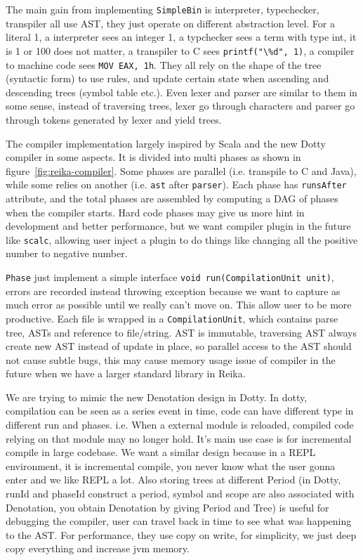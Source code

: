 \documentclass{article}
\begin{document}
The main gain from implementing \verb+SimpleBin+ is interpreter, typechecker, transpiler all use AST,
they just operate on different abstraction level.
For a literal 1, a interpreter sees an integer 1,
a typchecker sees a term with type int, it is 1 or 100 does not matter,
a transpiler to C sees \verb+printf("\%d", 1)+,
a compiler to machine code sees \verb+MOV EAX, 1h+.
They all rely on the shape of the tree (syntactic form) to use rules,
and update certain state when ascending and descending trees (symbol table etc.).
Even lexer and parser are similar to them in some sense, instead of traversing trees,
lexer go through characters and parser go through tokens generated by lexer and yield trees.

The compiler implementation largely inspired by Scala and the new Dotty compiler in some aspects.
It is divided into multi phases as shown in figure~\ref{fig:reika-compiler}.
Some phases are parallel (i.e. transpile to C and Java), while some relies on another (i.e. \verb+ast+ after \verb+parser+).
Each phase has \verb+runsAfter+ attribute,
and the total phases are assembled by computing a DAG of phases when the compiler starts.
Hard code phases may give us more hint in development and better performance,
but we want compiler plugin in the future like \verb+scalc+,
allowing user inject a plugin to do things like changing all the positive number to negative number.

\verb+Phase+ just implement a simple interface \verb+void run(CompilationUnit unit)+,
errors are recorded instead throwing exception because we want to capture as much error as possible until we really can't move on.
This allow user to be more productive.
Each file is wrapped in a \verb+CompilationUnit+, which contains parse tree, ASTs and reference to file/string.
AST is immutable, traversing AST always create new AST instead of update in place,
so parallel access to the AST should not cause subtle bugs,
this may cause memory usage issue of compiler in the future when we have a larger standard library in Reika.

We are trying to mimic the new Denotation design in Dotty.
In dotty, compilation can be seen as a series event in time,
code can have different type in different run and phases.
i.e. When a external module is reloaded, compiled code relying on that module may no longer hold.
It's main use case is for incremental compile in large codebase.
We want a similar design because in a REPL environment,
it is incremental compile, you never know what the user gonna enter and we like REPL a lot.
Also storing trees at different Period
(in Dotty, runId and phaseId construct a period, symbol and scope are also associated with Denotation,
you obtain Denotation by giving Period and Tree) is useful for debugging the compiler,
user can travel back in time to see what was happening to the AST.
For performance, they use copy on write, for simplicity, we just deep copy everything and increase jvm memory.
\end{document}
